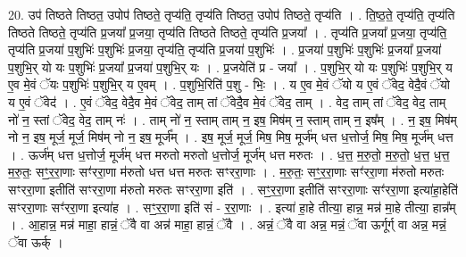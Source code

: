 \documentclass[17pt]{extarticle}
\begin{document}
20. उप॑ तिष्ठते तिष्ठत॒ उपोप॑ तिष्ठते॒ तृप्य॑ति॒ तृप्य॑ति तिष्ठत॒ उपोप॑ तिष्ठते॒ तृप्य॑ति । . ति॒ष्ठ॒ते॒ तृप्य॑ति॒ तृप्य॑ति तिष्ठते तिष्ठते॒ तृप्य॑ति प्र॒जया᳚ प्र॒जया॒ तृप्य॑ति तिष्ठते तिष्ठते॒ तृप्य॑ति प्र॒जया᳚ । . तृप्य॑ति प्र॒जया᳚ प्र॒जया॒ तृप्य॑ति॒ तृप्य॑ति प्र॒जया॑ प॒शुभिः॑ प॒शुभिः॑ प्र॒जया॒ तृप्य॑ति॒ तृप्य॑ति प्र॒जया॑ प॒शुभिः॑ । . प्र॒जया॑ प॒शुभिः॑ प॒शुभिः॑ प्र॒जया᳚ प्र॒जया॑ प॒शुभि॒र् यो यः प॒शुभिः॑ प्र॒जया᳚ प्र॒जया॑ प॒शुभि॒र् यः । . प्र॒जयेति॑ प्र - जया᳚ । . प॒शुभि॒र् यो यः प॒शुभिः॑ प॒शुभि॒र् य ए॒व मे॒वं ॅयः प॒शुभिः॑ प॒शुभि॒र् य ए॒वम् । . प॒शुभि॒रिति॑ प॒शु - भिः॒ । . य ए॒व मे॒वं ॅयो य ए॒वं ॅवेद॒ वेदै॒वं ॅयो य ए॒वं ॅवेद॑ । . ए॒वं ॅवेद॒ वेदै॒व मे॒वं ॅवेद॒ ताम् तां ॅवेदै॒व मे॒वं ॅवेद॒ ताम् । . वेद॒ ताम् तां ॅवेद॒ वेद॒ ताम् नो॑ न॒ स्तां ॅवेद॒ वेद॒ ताम् नः॑ । . ताम् नो॑ न॒ स्ताम् ताम् न॒ इष॒ मिष॑म् न॒ स्ताम् ताम् न॒ इष᳚म् । . न॒ इष॒ मिष॑म् नो न॒ इष॒ मूर्ज॒ मूर्ज॒ मिष॑म् नो न॒ इष॒ मूर्ज᳚म् । . इष॒ मूर्ज॒ मूर्ज॒ मिष॒ मिष॒ मूर्ज॑म् धत्त ध॒त्तोर्ज॒ मिष॒ मिष॒ मूर्ज॑म् धत्त । . ऊर्ज॑म् धत्त ध॒त्तोर्ज॒ मूर्ज॑म् धत्त मरुतो मरुतो ध॒त्तोर्ज॒ मूर्ज॑म् धत्त मरुतः । . ध॒त्त॒ म॒रु॒तो॒ म॒रु॒तो॒ ध॒त्त॒ ध॒त्त॒ म॒रु॒तः॒ सꣳ॒॒र॒रा॒णाः सꣳ॑ररा॒णा म॑रुतो धत्त धत्त मरुतः सꣳररा॒णाः । . म॒रु॒तः॒ सꣳ॒॒र॒रा॒णाः सꣳ॑ररा॒णा म॑रुतो मरुतः सꣳररा॒णा इतीति॑ सꣳररा॒णा म॑रुतो मरुतः सꣳररा॒णा इति॑ । . सꣳ॒॒र॒रा॒णा इतीति॑ सꣳररा॒णाः सꣳ॑ररा॒णा इत्या॑हा॒हेति॑ सꣳररा॒णाः सꣳ॑ररा॒णा इत्या॑ह । . सꣳ॒॒र॒रा॒णा इति॑ सं - र॒रा॒णाः । . इत्या॑ हा॒हे तीत्या॒ हान्न॒ मन्न॑ मा॒हे तीत्या॒ हान्न᳚म् । . आ॒हान्न॒ मन्न॑ माहा॒ हान्नं॒ ॅवै वा अन्न॑ माहा॒ हान्नं॒ ॅवै । . अन्नं॒ ॅवै वा अन्न॒ मन्नं॒ ॅवा ऊर्गूर्ग् वा अन्न॒ मन्नं॒ ॅवा ऊर्क् । \newline
\end{document}
